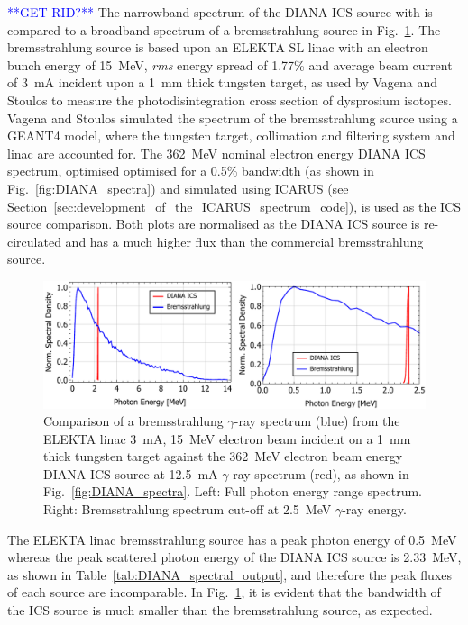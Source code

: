 \documentclass[../main.tex]{subfiles}
\begin{document}
\textcolor{blue}{**GET RID?**}
The narrowband spectrum of the DIANA ICS source with is compared to a broadband spectrum of a bremsstrahlung source in Fig.~\ref{fig:ICS_Brem_comparison}. The bremsstrahlung source is based upon an ELEKTA SL linac \cite{hansen1998quality} with an electron bunch energy of 15~\si{\mega\electronvolt}, \textit{rms} energy spread of 1.77\% and average beam current of 3~\si{\milli\ampere} incident upon a 1~\si{\milli\meter} thick tungsten target, as used by Vagena and Stoulos \cite{vagena2017photodisintegration} to measure the photodisintegration cross section of dysprosium isotopes. Vagena and Stoulos simulated the spectrum of the bremsstrahlung source using  a \textsc{GEANT4} \cite{agostinelli2003geant4} model, where the tungsten target, collimation and filtering system and linac are accounted for. The 362~\si{\mega\electronvolt} nominal electron energy DIANA ICS spectrum, optimised optimised for a 0.5\%  bandwidth (as shown in Fig.~\ref{fig:DIANA_spectra}) and simulated using \textsc{ICARUS} (see Section~\ref{sec:development_of_the_ICARUS_spectrum_code}), is used as the ICS source comparison. Both plots are normalised as the DIANA ICS source is re-circulated and has a much higher flux than the commercial bremsstrahlung source.
\begin{figure}[!h]
\centering
\includegraphics[width=\textwidth]{Figures/DIANA_Inverse_Compton_Source_Design/ICS_Brem_Comparison.pdf}
\caption{Comparison of a bremsstrahlung $\gamma$-ray spectrum (blue) from the ELEKTA linac 3~\si{\milli\ampere}, 15~\si{\mega\electronvolt} electron beam incident on a 1~\si{\milli\meter} thick tungsten target against the 362~\si{\mega\electronvolt} electron beam energy DIANA ICS source at 12.5~\si{\milli\ampere} $\gamma$-ray spectrum (red), as shown in Fig.~\ref{fig:DIANA_spectra}. Left: Full photon energy range spectrum. Right: Bremsstrahlung spectrum cut-off at 2.5~\si{\mega\electronvolt} $\gamma$-ray energy.}
\label{fig:ICS_Brem_comparison}
\end{figure}

The ELEKTA linac bremsstrahlung source has a peak photon energy of 0.5~\si{\mega\electronvolt} whereas the peak scattered photon energy of the DIANA ICS source is 2.33~\si{\mega\electronvolt}, as shown in Table~\ref{tab:DIANA_spectral_output}, and therefore the peak fluxes of each source are incomparable. In Fig.~\ref{fig:ICS_Brem_comparison}, it is evident that the bandwidth of the ICS source is much smaller than the bremsstrahlung source, as expected.
\end{document}
